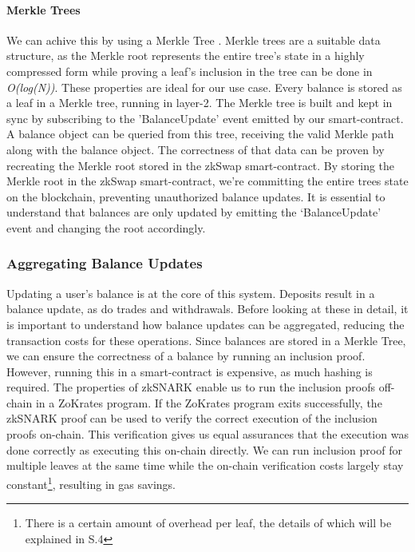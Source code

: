 \documentclass[../../thesis.tex]{subfiles}
\begin{document}
\paragraph{Merkle Trees}
We can achive this by using a Merkle Tree \cite{szydlo2004merkle}. Merkle trees are a suitable data structure, as the Merkle root represents the entire tree's state in a highly compressed form while proving a leaf's inclusion in the tree can be done in \textit{O(log(N))}. These properties are ideal for our use case. Every balance is stored as a leaf in a Merkle tree, running in layer-2. The Merkle tree is built and kept in sync by subscribing to the 'BalanceUpdate' event emitted by our smart-contract. A balance object can be queried from this tree, receiving the valid Merkle path along with the balance object. The correctness of that data can be proven by recreating the Merkle root stored in the zkSwap smart-contract. By storing the Merkle root in the zkSwap smart-contract, we're committing the entire trees state on the blockchain, preventing unauthorized balance updates. It is essential to understand that balances are only updated by emitting the `BalanceUpdate' event and changing the root accordingly. 

\subsubsection{Aggregating Balance Updates} \label{aggr_balance}
Updating a user's balance is at the core of this system. Deposits result in a balance update, as do trades and withdrawals. Before looking at these in detail, it is important to understand how balance updates can be aggregated, reducing the transaction costs for these operations. Since balances are stored in a Merkle Tree, we can ensure the correctness of a balance by running an inclusion proof. However, running this in a smart-contract is expensive, as much hashing is required. The properties of zkSNARK enable us to run the inclusion proofs off-chain in a ZoKrates program. If the ZoKrates program exits successfully, the zkSNARK proof can be used to verify the correct execution of the inclusion proofs on-chain. This verification gives us equal assurances that the execution was done correctly as executing this on-chain directly. We can run inclusion proof for multiple leaves at the same time while the on-chain verification costs largely stay constant\footnote{There is a certain amount of overhead per leaf, the details of which will be explained in S.4}, resulting in gas savings.
\end{document}
